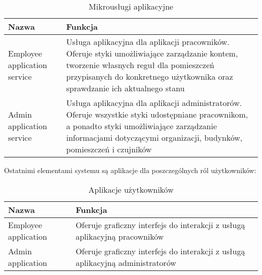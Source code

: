     \begin{xltabular}{1\textwidth} { 
        | >{\raggedright\arraybackslash}X        
        | >{\raggedright\arraybackslash}X | }
        \caption{Mikrousługi aplikacyjne} \label{tab:mikrouslugi-aplikacyjne} \\
        \hline
       Nazwa & Funkcja \\
       \hline
       Employee application service & 
       Usługa aplikacyjna dla aplikacji pracowników. Oferuje styki umożliwiające 
       zarządzanie kontem, tworzenie własnych reguł dla pomieszczeń przypisanych do 
       konkretnego użytkownika oraz sprawdzanie ich aktualnego stanu \\
       \hline
       Admin application service &
       Usługa aplikacyjna dla aplikacji administratorów. Oferuje wszystkie styki 
       udostępniane pracownikom, a ponadto styki umożliwiające zarządzanie informacjami 
       dotyczącymi organizacji, budynków, pomieszczeń i czujników \\
       \hline
    \end{xltabular}

Ostatnimi elementami systemu są aplikacje dla poszczególnych ról użytkowników:

    \begin{xltabular}{1\textwidth} { 
        | >{\raggedright\arraybackslash}X        
        | >{\raggedright\arraybackslash}X | }
        \caption{Aplikacje użytkowników} \label{tab:aplikacje-uzytkownikow} \\
        \hline
       Nazwa & Funkcja \\
       \hline
       Employee application & 
       Oferuje graficzny interfejs do interakcji z usługą aplikacyjną pracowników \\
       \hline
       Admin application &
       Oferuje graficzny interfejs do interakcji z usługą aplikacyjną administratorów \\
       \hline
    \end{xltabular}